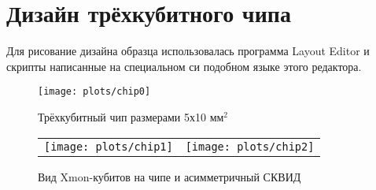 \documentclass[12pt, a4paper, openany]{book}
\begin{document}
\section{Дизайн трёхкубитного чипа}
Для рисование дизайна образца использовалась программа Layout Editor и скрипты написанные на специальном си подобном языке этого редактора.

\begin{figure}[H]
		\begin{center}
\texttt{[image: plots/chip0]}
\caption{Трёхкубитный чип размерами 5х10 мм$^2$}
		\end{center}
\end{figure}



\begin{figure}[H]\center
\begin{tabular}{cc}
\texttt{[image: plots/chip1]}
&
\texttt{[image: plots/chip2]}
\end{tabular}
\caption{Вид Xmon-кубитов на чипе и асимметричный СКВИД}
\end{figure}
\end{document}
